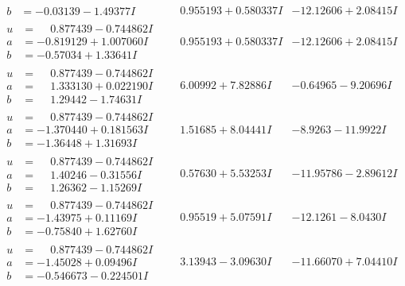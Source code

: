 \documentclass[1p]{elsarticle_modified}
\theoremstyle{definition}
\begin{document}
$$\begin{array}{c|c|c}
\begin{aligned}
b &= -0.03139 - 1.49377 I\end{aligned}
 & \phantom{-}0.955193 + 0.580337 I & -12.12606 + 2.08415 I \\ \hline\begin{aligned}
u &= \phantom{-}0.877439 - 0.744862 I \\
a &= -0.819129 + 1.007060 I \\
b &= -0.57034 + 1.33641 I\end{aligned}
 & \phantom{-}0.955193 + 0.580337 I & -12.12606 + 2.08415 I \\ \hline\begin{aligned}
u &= \phantom{-}0.877439 - 0.744862 I \\
a &= \phantom{-}1.333130 + 0.022190 I \\
b &= \phantom{-}1.29442 - 1.74631 I\end{aligned}
 & \phantom{-}6.00992 + 7.82886 I & -0.64965 - 9.20696 I \\ \hline\begin{aligned}
u &= \phantom{-}0.877439 - 0.744862 I \\
a &= -1.370440 + 0.181563 I \\
b &= -1.36448 + 1.31693 I\end{aligned}
 & \phantom{-}1.51685 + 8.04441 I & -8.9263 - 11.9922 I \\ \hline\begin{aligned}
u &= \phantom{-}0.877439 - 0.744862 I \\
a &= \phantom{-}1.40246 - 0.31556 I \\
b &= \phantom{-}1.26362 - 1.15269 I\end{aligned}
 & \phantom{-}0.57630 + 5.53253 I & -11.95786 - 2.89612 I \\ \hline\begin{aligned}
u &= \phantom{-}0.877439 - 0.744862 I \\
a &= -1.43975 + 0.11169 I \\
b &= -0.75840 + 1.62760 I\end{aligned}
 & \phantom{-}0.95519 + 5.07591 I & -12.1261 - 8.0430 I \\ \hline\begin{aligned}
u &= \phantom{-}0.877439 - 0.744862 I \\
a &= -1.45028 + 0.09496 I \\
b &= -0.546673 - 0.224501 I\end{aligned}
 & \phantom{-}3.13943 - 3.09630 I & -11.66070 + 7.04410 I \\ \hline\begin{aligned}

\end{aligned}
\end{array}$$
\end{document}

